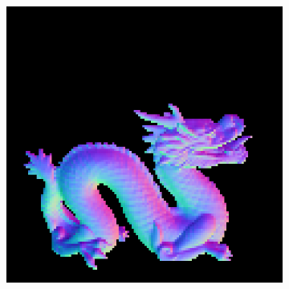 \begin{figure}
\begin{subfigure}[b]{0.18\linewidth}
	\end{subfigure}
	\begin{subfigure}[b]{0.18\linewidth}
		\includegraphics[width=\linewidth]{./Figures/gcnn_synthetic/fancy_eval_7_normal_f4.png}
	\end{subfigure}
	

\end{figure}
